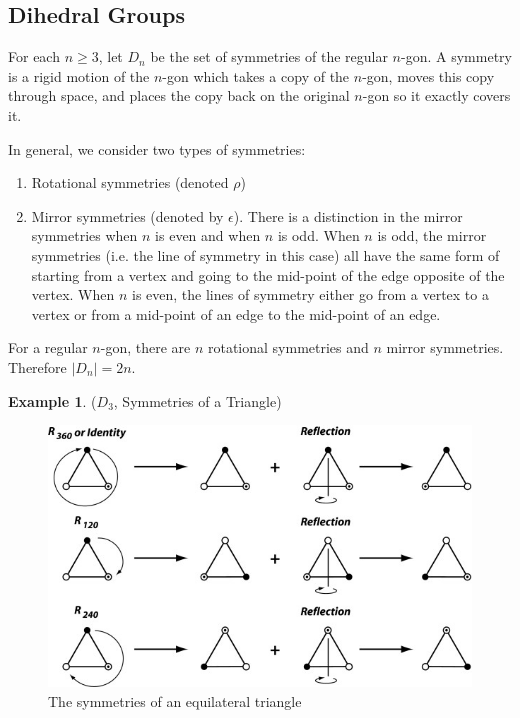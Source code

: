 \documentclass[12pt]{article}
\theoremstyle{definition}
\newcommand{\e}{\epsilon}
\newtheorem{example}{\color{WildStrawberry}Example}
\theoremstyle{definition}
\begin{document}
\subsection{Dihedral Groups}
For each $n \geq 3$, let $D_n$ be the set of symmetries of the regular $n$-gon. A symmetry is a rigid motion of the $n$-gon which takes a copy of the $n$-gon, moves this copy through space, and places the copy back on the original $n$-gon so it exactly covers it.  

In general, we consider two types of symmetries:
\begin{enumerate}
	\item Rotational symmetries (denoted $\rho$)
	\item Mirror symmetries (denoted by $\e$). There is a distinction in the mirror symmetries when $n$ is even and when $n$ is odd. When $n$ is odd, the mirror symmetries (i.e. the line of symmetry in this case) all have the same form of starting from a vertex and going to the mid-point of the edge opposite of the vertex. When $n$ is even, the lines of symmetry either go from a vertex to a vertex or from a mid-point of an edge to the mid-point of an edge. 
\end{enumerate}
For a regular $n$-gon, there are $n$ rotational symmetries and $n$ mirror symmetries. Therefore $|D_n| = 2n$.

\begin{example}($D_3$, Symmetries of a Triangle)
\begin{figure}[H]
	\begin{center}
		\includegraphics[scale=3]{triangle_symmetries}
	\end{center}
	\caption{The symmetries of an equilateral triangle}
	\label{triangle_sym}
\end{figure}
\end{example}
\end{document}
